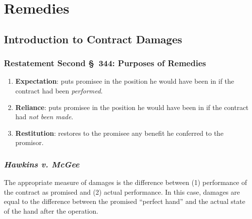 \section{Remedies}

\subsection{Introduction to Contract Damages}

\subsubsection{Restatement Second \S\ 344: Purposes of Remedies}

\begin{enumerate}
    \item \textbf{Expectation}: puts promisee in the position he would have been in if 
    the contract had been \emph{performed}.
    \item \textbf{Reliance}: puts promisee in the position he would have been in 
    if the contract had \emph{not been made}.
    \item \textbf{Restitution}: restores to the promisee any benefit he 
    conferred to the promisor.
\end{enumerate}

\subsubsection{\emph{Hawkins v. McGee}}

The appropriate measure of damages is the difference between (1) performance 
of the contract as promised and (2) actual performance. In this case, damages 
are equal to the difference between the promised ``perfect hand'' and the 
actual state of the hand after the operation.

